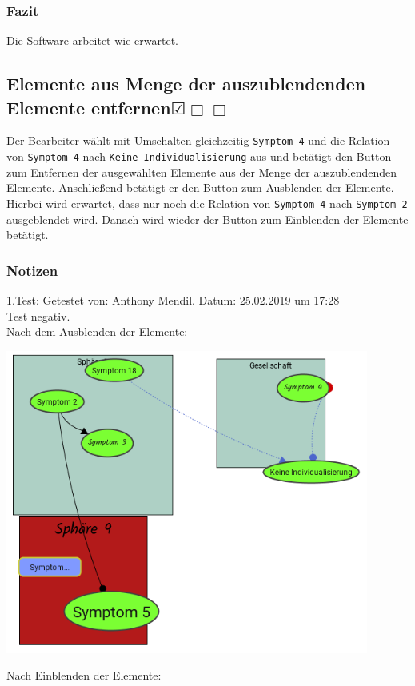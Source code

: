 \documentclass{scrartcl}
\newcommand{\subsectiont}[2]{\subsection[#1]{#1{\normalsize\normalfont #2}}}
\newcommand{\leer}{$\Box$}
\newcommand{\ok}{$\CheckedBox$}
\begin{document}
\subsubsection{Fazit}
Die Software arbeitet wie erwartet.

\subsectiont{Elemente aus Menge der auszublendenden Elemente entfernen}{\dotfill\ok\leer\leer}
Der Bearbeiter wählt mit Umschalten gleichzeitig \texttt{Symptom 4} und die Relation von \texttt{Symptom 4} nach \texttt{Keine Individualisierung} aus und betätigt den Button zum Entfernen der ausgewählten Elemente aus der Menge der auszublendenden Elemente. Anschließend betätigt er den Button zum Ausblenden der Elemente. Hierbei wird erwartet, dass nur noch die Relation von \texttt{Symptom 4} nach \texttt{Symptom 2} ausgeblendet wird. Danach wird wieder der Button zum Einblenden der Elemente betätigt. 
\subsubsection{Notizen}
1.Test: Getestet von: Anthony Mendil. Datum: 25.02.2019 um 17:28 \\
Test negativ. \\
Nach dem Ausblenden der Elemente:
\begin{center}
\includegraphics[height=10cm]{3_55.PNG}
\end{center}
Nach Einblenden der Elemente:
\end{document}
